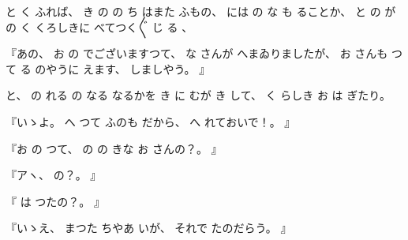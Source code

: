 %
と
く
ふれば、
%
き
の
の
ち
はまた
ふもの、
%
には
の
な
も
ることか、
%
と
の
が
の
く
くろしきに
べてつく〴〵
じ
る
、

%
『あの、
%
お
の
でございますつて、
%
な
さんが
へまゐりましたが、
%
お
さんも
つて
る
のやうに
えます、
%
しましやう。
』

%
と、
%
の
れる
の
なる
なるかを
き
に
むが
き
して、
%
く
らしき
お
は
ぎたり。

%
『いゝよ。
%
へ
つて
ふのも
だから、
%
へ
れておいで！。
』

%
『お
の
つて、
%
の
の
きな
お
さんの？。
』

%
『アヽ、
%
の？。
』

%
『
は
つたの？。
』

%
『いゝえ、
%
まつた
ちやあ
いが、
%
それで
たのだらう。
』

